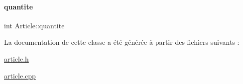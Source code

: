 \mbox{\label{class_article_a4bb0882b68de349e913fd0b46bf6da6a}} 
\paragraph{\texorpdfstring{quantite}{quantite}}
{\footnotesize\ttfamily int Article\+::quantite\hspace{0.3cm}{\ttfamily [private]}}



La documentation de cette classe a été générée à partir des fichiers suivants \+:\begin{DoxyCompactItemize}
\item 
\hyperlink{article_8h}{article.\+h}\item 
\hyperlink{article_8cpp}{article.\+cpp}\end{DoxyCompactItemize}
